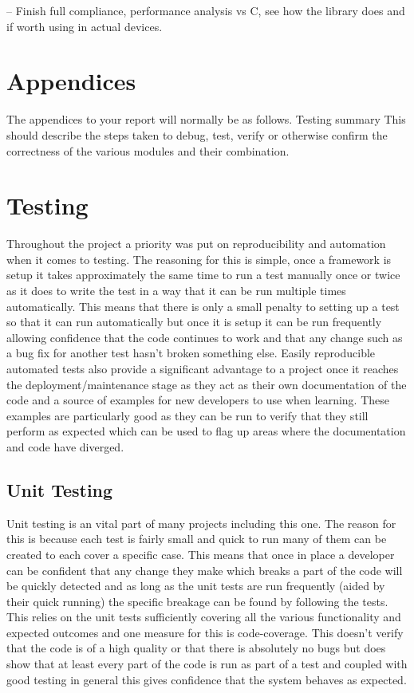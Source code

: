 \documentclass[11pt,a4paper]{report}
\begin{document}
	-- Finish full compliance, performance analysis vs C, see how the library does and if worth using in actual devices. 
	
	\section{Appendices}
	The appendices to your report will normally be as follows.
	Testing
	summary
	This should describe the steps taken to debug, test,
	verify or otherwise confirm the correctness of the
	various modules and their combination.
	
	\section{Testing}
	Throughout the project a priority was put on reproducibility and automation when it comes to testing. The reasoning for this is simple, once a framework is setup it takes approximately the same time to run a test manually once or twice as it does to write the test in a way that it can be run multiple times automatically. This means that there is only a small penalty to setting up a test so that it can run automatically but once it is setup it can be run frequently allowing confidence that the code continues to work and that any change such as a bug fix for another test hasn't broken something else. Easily reproducible automated tests also provide a significant advantage to a project once it reaches the deployment/maintenance stage as they act as their own documentation of the code and a source of examples for new developers to use when learning. These examples are particularly good as they can be run to verify that they still perform as expected which can be used to flag up areas where the documentation and code have diverged.\\
	
	\subsection{Unit Testing}
	Unit testing is an vital part of many projects including this one. The reason for this is because each test is fairly small and quick to run many of them can be created to each cover a specific case. This means that once in place a developer can be confident that any change they make which breaks a part of the code will be quickly detected and as long as the unit tests are run frequently (aided by their quick running) the specific breakage can be found by following the tests. This relies on the unit tests sufficiently covering all the various functionality and expected outcomes and one measure for this is code-coverage. This doesn't verify that the code is of a high quality or that there is absolutely no bugs but does show that at least every part of the code is run as part of a test and coupled with good testing in general this gives confidence that the system behaves as expected.\\
	
\end{document}
